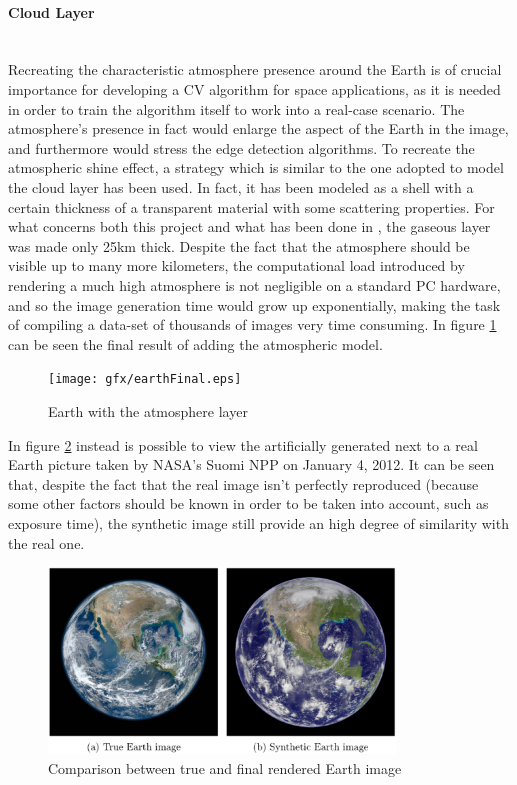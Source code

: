 \paragraph{Cloud Layer}\mbox{}\\
Recreating the characteristic atmosphere presence around the Earth is of crucial importance for developing a CV algorithm for space applications, as it is needed in order to train the algorithm itself to work into a real-case scenario.
The atmosphere's presence in fact would enlarge the aspect of the Earth in the image, and furthermore would stress the edge detection algorithms.
To recreate the atmospheric shine effect, a strategy which is similar to the one adopted to model the cloud layer has been used. In fact, it has been modeled as a shell with a certain thickness of a transparent material with some scattering properties.
For what concerns both this project and what has been done in \cite{jacopo}, the gaseous layer was made only \si{25}{km} thick. Despite the fact that the atmosphere should be visible up to many more kilometers, the computational load introduced by rendering a much high atmosphere is not negligible on a standard PC hardware, and so the image generation time would grow up exponentially, making the task of compiling a data-set of thousands of images very time consuming.
In figure \ref{fig:earthAtmo} can be seen the final result of adding the atmospheric model.\\

\begin{figure}[H]
\centering
\texttt{[image: gfx/earthFinal.eps]}
\caption{Earth with the atmosphere layer}
\label{fig:earthAtmo}
\end{figure}

\bigskip

In figure \ref{fig:trueVsFake} instead is possible to view the artificially generated next to a real Earth picture taken by NASA's Suomi NPP on January 4, 2012.
It can be seen that, despite the fact that the real image isn't perfectly reproduced (because some other factors should be known in order to be taken into account, such as exposure time), the synthetic image still provide an high degree of similarity with the real one.

\begin{figure}[H]
\centering
\includegraphics[width=0.82\textwidth]{gfx/trueVsFake.eps}
\caption{Comparison between true and final rendered Earth image}
\label{fig:trueVsFake}
\end{figure}

